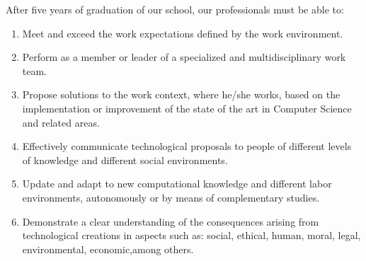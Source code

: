 After five years of graduation of our school, 
our professionals must be able to:
\begin{enumerate}
\item Meet and exceed the work expectations defined by the work environment.
\item Perform as a member or leader of a specialized and multidisciplinary work team.
\item Propose solutions to the work context, where he/she works, based on the implementation or improvement of the state of the art in Computer Science and related areas.
\item Effectively communicate technological proposals to people of different levels of
knowledge and different social environments.
\item Update and adapt to new computational knowledge and different labor environments,
autonomously or by means of complementary studies.
\item  Demonstrate a clear understanding of the consequences arising from technological
creations in aspects such as: social, ethical, human, moral, legal, environmental, economic,among others.

\end{enumerate}

